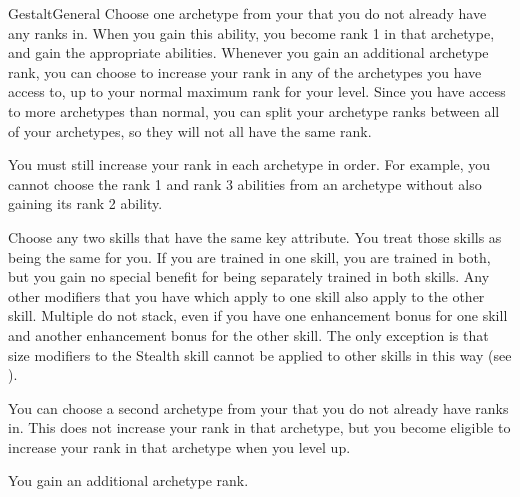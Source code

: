   \begin{feat}{Gestalt}{General}
     Choose one archetype from your  that you do not already have any ranks in.
    When you gain this ability, you become rank 1 in that archetype, and gain the appropriate abilities.
    Whenever you gain an additional archetype rank, you can choose to increase your rank in any of the archetypes you have access to, up to your normal maximum rank for your level.
    Since you have access to more archetypes than normal, you can split your archetype ranks between all of your archetypes, so they will not all have the same rank.

    You must still increase your rank in each archetype in order.
    For example, you cannot choose the rank 1 and rank 3 abilities from an archetype without also gaining its rank 2 ability.

     Choose any two skills that have the same key attribute.
    You treat those skills as being the same for you.
    If you are trained in one skill, you are trained in both, but you gain no special benefit for being separately trained in both skills.
    Any other modifiers that you have which apply to one skill also apply to the other skill.
    Multiple  do not stack, even if you have one enhancement bonus for one skill and another enhancement bonus for the other skill.
    The only exception is that size modifiers to the Stealth skill cannot be applied to other skills in this way (see ).

     You can choose a second archetype from your  that you do not already have ranks in.
    This does not increase your rank in that archetype, but you become eligible to increase your rank in that archetype when you level up.

     You gain an additional archetype rank.
  \end{feat}

